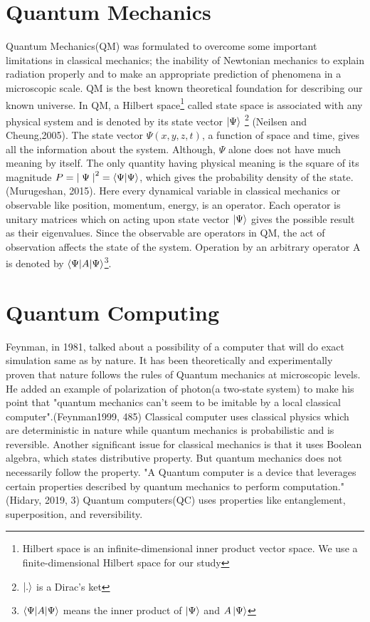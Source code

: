 
\section{Quantum Mechanics}
Quantum Mechanics(QM) was formulated to overcome some important limitations in classical mechanics; the inability of Newtonian mechanics to explain radiation properly and to make an appropriate prediction of phenomena in a microscopic scale.\cite{zettili2009} \acrshort{QM} is the best known theoretical foundation for describing our known universe. In \acrshort{QM}, a Hilbert space\footnote{Hilbert space is an infinite-dimensional inner product vector space. We use a finite-dimensional Hilbert space for our study} called state space is associated with any physical system and is denoted by its state vector $\ket{\Psi}$ \footnote{$\ket{.}$ is a Dirac's ket} \cite{Nielsen2002}(Neilsen and Cheung,2005). The state vector $\Psi(x,y,z,t)$, a function of space and time,  gives all the information about the system. Although, $\Psi$ alone does not have much meaning by itself. The only quantity having physical meaning is the square of its magnitude $P = {\mid\Psi\mid}^{2} = \braket{\Psi|\Psi}$, which gives the probability density of the state. \cite{murugeshan}(Murugeshan, 2015). Here every dynamical variable in classical mechanics or observable like position, momentum, energy, is an operator. Each operator is unitary matrices which on acting upon state vector $\ket{\Psi}$ gives the possible result as their eigenvalues. Since the observable are operators in \acrshort{QM}, the act of observation affects the state of the system. Operation by an arbitrary operator A is denoted by $\braket{\Psi|A|\Psi}$\footnote{$\braket{\Psi|A|\Psi}$ means the inner product of $\ket{\Psi}$ and $A\ket{\Psi}$}.

\section{Quantum Computing}
Feynman, in 1981, talked about a possibility of a computer that will do exact simulation same as by nature.\cite{feynman1999} It has been theoretically and experimentally proven that nature follows the rules of Quantum mechanics at microscopic levels. He added an example of polarization of photon(a two-state system) to make his point that "quantum mechanics can't seem to be imitable by a local classical computer".\cite{feynman1999}(Feynman1999, 485)  Classical computer uses classical physics which are deterministic in nature while quantum mechanics is probabilistic and is reversible. Another significant issue for classical mechanics is that it uses Boolean algebra, which states distributive property. But quantum mechanics does not necessarily follow the property\cite{calabrese2005}. "A Quantum computer is a device that leverages certain properties described by quantum mechanics to perform computation." \cite{Hidary} (Hidary, 2019, 3) Quantum computers(\acrshort{QC}) uses properties like entanglement, superposition, and reversibility.

